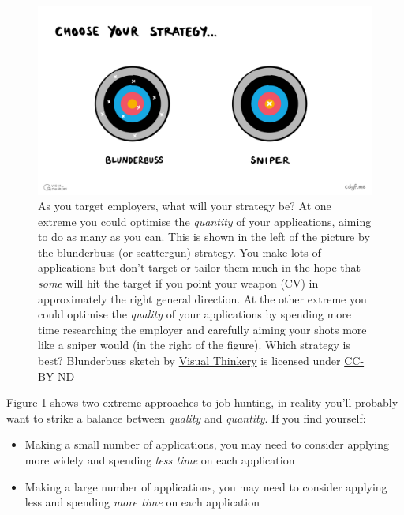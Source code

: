 \documentclass[
]{book}
\providecommand{\tightlist}{%
  \setlength{\itemsep}{0pt}\setlength{\parskip}{0pt}}
\begin{document}
\begin{figure}

{\centering \includegraphics[width=1\linewidth]{images/Blunderbuss} 

}

\caption{As you target employers, what will your strategy be? At one extreme you could optimise the \emph{quantity} of your applications, aiming to do as many as you can. This is shown in the left of the picture by the \href{https://en.wikipedia.org/wiki/Blunderbuss}{blunderbuss} (or scattergun) strategy. You make lots of applications but don't target or tailor them much in the hope that \emph{some} will hit the target if you point your weapon (CV) in approximately the right general direction. At the other extreme you could optimise the \emph{quality} of your applications by spending more time researching the employer and carefully aiming your shots more like a sniper would (in the right of the figure). Which strategy is best? Blunderbuss sketch by \href{https://visualthinkery.com/}{Visual Thinkery} is licensed under \href{https://creativecommons.org/licenses/by-nd/4.0/}{CC-BY-ND}}\label{fig:blunderbuss-fig}
\end{figure}



Figure \ref{fig:blunderbuss-fig} shows two extreme approaches to job hunting, in reality you'll probably want to strike a balance between \emph{quality} and \emph{quantity}. If you find yourself:

\begin{itemize}
\tightlist
\item
  Making a small number of applications, you may need to consider applying more widely and spending \emph{less time} on each application
\item
  Making a large number of applications, you may need to consider applying less and spending \emph{more time} on each application
\end{itemize}
\end{document}
